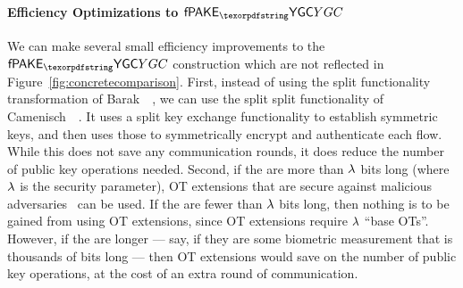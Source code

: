 
\paragraph{Efficiency Optimizations to $\PfakeYGC$}

We can make several small efficiency improvements to the $\PfakeYGC$ construction which are not reflected in Figure~\ref{fig:concretecomparison}.
First, instead of using the split functionality transformation of Barak~\etal~\cite{C:BCLPR05}, we can use the split split functionality of Camenisch~\etal~\cite{C:CCGS10}.
It uses a split key exchange functionality to establish symmetric keys, and then uses those to symmetrically encrypt and authenticate each flow.
While this does not save any communication rounds, it does reduce the number of public key operations needed.
Second, if the \passwords are more than $\lambda$ bits long (where $\lambda$ is the security parameter), OT extensions that are secure against malicious adversaries~\cite{EC:AHMR15} can be used.
If the \passwords are fewer than $\lambda$ bits long, then nothing is to be gained from using OT extensions, since OT extensions require $\lambda$ ``base OTs''. 
However, if the \passwords are longer --- say, if they are some biometric measurement that is thousands of bits long --- then OT extensions would save on the number of public key operations, at the cost of an extra round of communication. 

